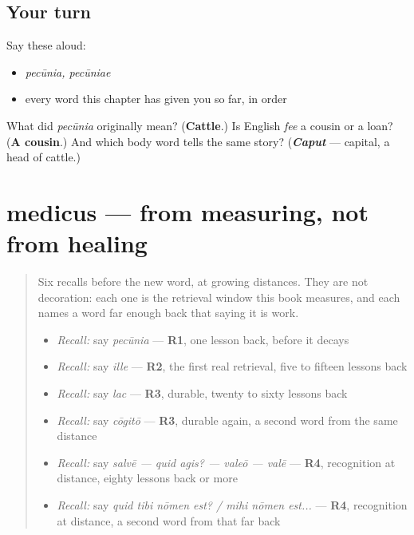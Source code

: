 \subsection*{Your turn}
Say these aloud:

\begin{itemize}
\raggedright
  \item \emph{pecūnia, pecūniae}
  \item every word this chapter has given you so far, in order
\end{itemize}

\begin{tcolorbox}[breakable,colback=teal!4,colframe=teal!35!black,title={Before you move on}]
What did \emph{pecūnia} originally mean? (\textbf{Cattle}.) Is English \emph{fee} a cousin or a loan? (\textbf{A cousin}.) And which body word tells the same story? (\emph{\textbf{Caput}} — capital, a head of cattle.)
\end{tcolorbox}
\section[medicus, medicī]{medicus — from measuring, not from healing}

\label{lesson:LA-C51-medicus}



\begin{quote}
Six recalls before the new word, at growing distances. They are not decoration: each one is the retrieval window this book measures, and each names a word far enough back that saying it is work.

\begin{itemize}
\raggedright
  \item \emph{Recall:} say \emph{pecūnia} — \textbf{R1}, one lesson back, before it decays
  \item \emph{Recall:} say \emph{ille} — \textbf{R2}, the first real retrieval, five to fifteen lessons back
  \item \emph{Recall:} say \emph{lac} — \textbf{R3}, durable, twenty to sixty lessons back
  \item \emph{Recall:} say \emph{cōgitō} — \textbf{R3}, durable again, a second word from the same distance
  \item \emph{Recall:} say \emph{salvē — quid agis? — valeō — valē} — \textbf{R4}, recognition at distance, eighty lessons back or more
  \item \emph{Recall:} say \emph{quid tibi nōmen est? / mihi nōmen est...} — \textbf{R4}, recognition at distance, a second word from that far back
\end{itemize}
\end{quote}

